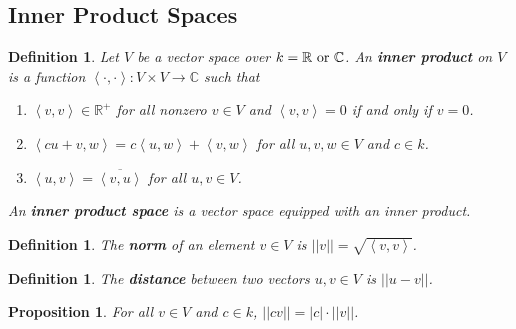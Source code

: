 \documentclass{article}
\theoremstyle{colontheorem}
\newtheorem{proposition}[theorem]{Proposition}
\newtheorem{definition}[theorem]{Definition}
\newenvironment{Proposition}
{
	\begin{mdframed}[backgroundcolor=TheoremOrange!10]
	\begin{proposition}
}
{
	\end{proposition}
	\end{mdframed}
	
	\vspace{.15in}
}
\newenvironment{Def}
{
	\begin{mdframed}[backgroundcolor=DefGreen!10]
	\begin{definition}
}
{
	\end{definition}
	\end{mdframed}
	
	\vspace{.15in}
}
\begin{document}
\begin{center}
	\pagebreak
	
	\section{Inner Product Spaces}
	
	\vspace{.1in}
\end{center}



\begin{Def}
	
	Let $V$ be a vector space over $k = \mathbb{R}\ \textnormal{or}\ \mathbb{C}$. An \textbf{inner product} on $V$ is a function $\left< \cdot, \cdot \right> : V \times V \longrightarrow \mathbb{C}$ such that
	
	\begin{enumerate}
		
		\item $\left< v, v \right> \in \mathbb{R}^+$ for all nonzero $v \in V$ and $\left< v, v \right> = 0$ if and only if $v = 0$.
		\item $\left< cu + v, w \right> = c \left< u, w \right> + \left< v, w \right>$ for all $u, v, w \in V$ and $c \in k$.
		\item $\left< u, v \right> = \overline{\left< v, u \right>}$ for all $u, v \in V$.
		
	\end{enumerate}
	
	An \textbf{inner product space} is a vector space equipped with an inner product.
	
\end{Def}



\begin{Def}
	
	The \textbf{norm} of an element $v \in V$ is $||v|| = \sqrt{\left< v, v \right>}$.
	
\end{Def}



\begin{Def}
	
	The \textbf{distance} between two vectors $u, v \in V$ is $||u - v||$.
	
\end{Def}



\begin{Proposition}
	
	For all $v \in V$ and $c \in k$, $||cv|| = |c| \cdot ||v||$.
	
\end{Proposition}
\end{document}
